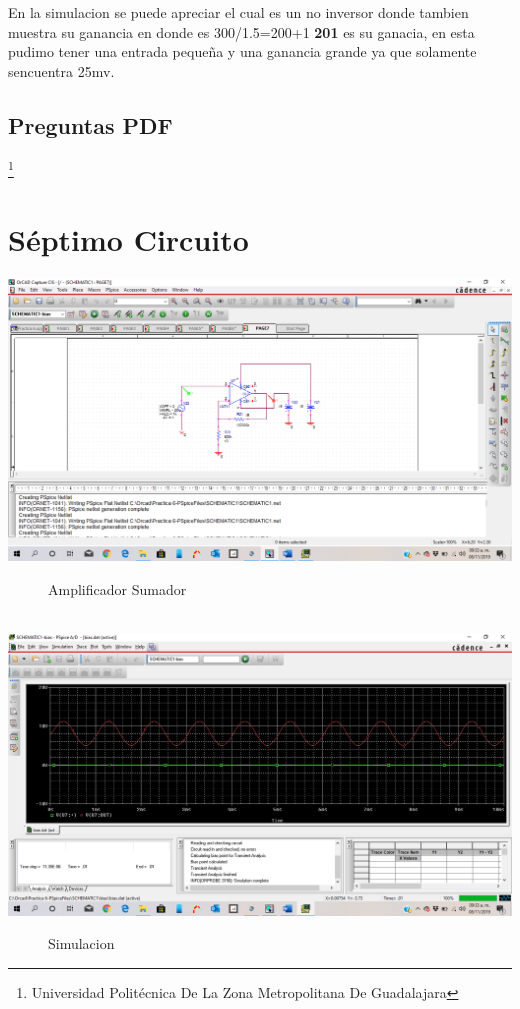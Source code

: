 \documentclass[10pt,a4paper]{article}
\begin{document}
En la simulacion se puede apreciar el cual es un no inversor donde tambien muestra su ganancia en donde es 300/1.5=200+1 \textbf{201} es su ganacia, en esta pudimo tener una entrada pequeña y una ganancia grande ya que solamente sencuentra 25mv.









\subsection{Preguntas PDF}


\footnote{Universidad Politécnica De La Zona Metropolitana De Guadalajara} 

\newpage

\section{Séptimo Circuito}
\begin{center}
 \includegraphics[scale=0.3]{13.png}
 \begin{figure}[hbtp]
 \caption{Amplificador Sumador}
 \centering
 \end{figure}\\
  \includegraphics[scale=0.3]{14.png}
 \begin{figure}[hbtp]
 \caption{Simulacion}
 \centering
 \end{figure} 
\end{center}
\end{document}
